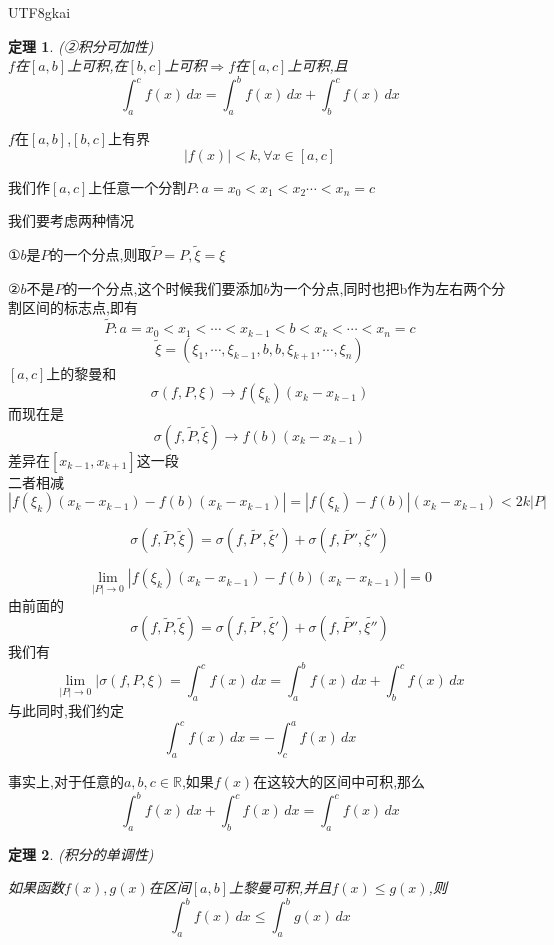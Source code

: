 \documentclass{article}
\newtheorem{theorem}{定理}[subsection]
\newenvironment{cproof}{%
\heiti{证明}\kaishu
}{%
}
\newcommand{\RR}{\mathbb{R}}
\begin{document}
\begin{CJK}{UTF8}{gkai}
\begin{theorem}(②积分可加性)\\

  $f$在$[a,b]$上可积,在$[b,c]$上可积$\Rightarrow f$在$[a,c]$上可积,且
  \[\int_{a}^{c}f(x)\,dx=\int_{a}^{b}f(x)\,dx+\int_{b}^{c}f(x)\,dx\]
  
\end{theorem}

\begin{cproof}
$f$在$[a,b]$,$[b,c]$上有界\\
\[|f(x)|<k,\forall x\in[a,c]\]

我们作$[a,c]$上任意一个分割$P: a = x_0< x_1 <x_2\cdots < x_n = c$

我们要考虑两种情况

①$b$是$P$的一个分点,则取$\tilde{P} = P ,\tilde{\xi} = \xi$

②$b$不是$P$的一个分点,这个时候我们要添加$b$为一个分点,同时也把b作为左右两个分割区间的标志点,即有\\

\[\tilde{P}: a = x_0< x_1 <\cdots<x_{k-1} < b< x_k<\cdots < x_n = c\]
\[\tilde{\xi} = (\xi_1,\cdots,\xi_{k-1},b,b,\xi_{k+1},\cdots,\xi_n)\]
$[a,c]$上的黎曼和
\[\sigma(f,P,\xi) \rightarrow f(\xi_k)(x_k - x_{k-1})\]
而现在是
\[\sigma(f,\tilde{P},\tilde{\xi})\rightarrow f(b)(x_k - x_{k-1})\]
差异在$[x_{k-1},x_{k+1}]$这一段\\

二者相减
\[\left|f(\xi_k)(x_k - x_{k-1})-f(b)(x_k - x_{k-1})\right| = \left|f(\xi_k)-f(b)\right|(x_k - x_{k-1}) < 2k |P|\]

\[\sigma(f,\tilde{P},\tilde{\xi}) = \sigma(f,\tilde{P'},\tilde{\xi'}) + \sigma(f,\tilde{P''},\tilde{\xi''})\]

\[\lim_{|P|\to 0}\left|f(\xi_k)(x_k - x_{k-1})-f(b)(x_k - x_{k-1})\right| = 0\]
由前面的
\[\sigma(f,\tilde{P},\tilde{\xi}) = \sigma(f,\tilde{P'},\tilde{\xi'}) + \sigma(f,\tilde{P''},\tilde{\xi''})\]
我们有
\[\lim_{|P|\to 0}|\sigma(f,P,\xi) =\int_{a}^{c}f(x)\,dx=\int_{a}^{b}f(x)\,dx+\int_{b}^{c}f(x)\,dx\]
\end{cproof}
与此同时,我们约定
\[\int_{a}^{c}f(x)\,dx=-\int_{c}^{a}f(x)\,dx\]

事实上,对于任意的$a,b,c\in \RR$,如果$f(x)$在这较大的区间中可积,那么
\[\int_{a}^{b}f(x)\,dx + \int_{b}^{c}f(x)\,dx=\int_{a}^{c}f(x)\,dx\]

\begin{theorem}
  (积分的单调性)

  如果函数$f(x),g(x)$在区间$[a,b]$上黎曼可积,并且$f(x) \leq g(x)$,则
  \[\int_{a}^{b}f(x)\,dx\leq \int_{a}^{b}g(x)\,dx\]
\end{theorem}


\end{CJK}
\end{document}
